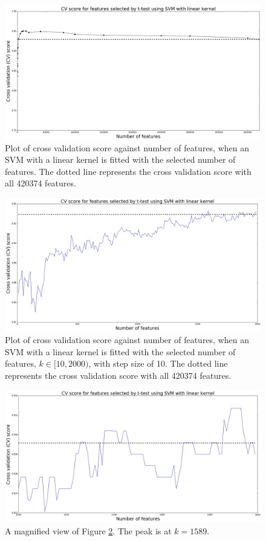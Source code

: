 \documentclass[12pt, twoside, a4paper]{report}
\begin{document}
\begin{figure}
\centering
\includegraphics[width=\textwidth]{images/t_test_range.jpeg}
\caption{Plot of cross validation score against number of features, when an SVM with a linear kernel is fitted with the selected number of features. The dotted line represents the cross validation score with all 420374 features.}
\label{body:t_test:fig:range}
\end{figure}

\begin{figure}
\centering
\includegraphics[width=\textwidth]{images/t_test_2000_uneq_var1.jpeg}
\caption{Plot of cross validation score against number of features, when an SVM with a linear kernel is fitted with the selected number of features, $k \in [10, 2000)$, with step size of 10. The dotted line represents the cross validation score with all 420374 features.}
\label{body:t_test:fig}
\end{figure}

\begin{figure}
\centering
\includegraphics[width=\textwidth]{images/t_test_2000_uneq_var_zoom.jpeg}
\caption{A magnified view of Figure \ref{body:t_test:fig}. The peak is at $k=1589$.}
\label{body:t_test:fig_zoom}
\end{figure}
\end{document}
